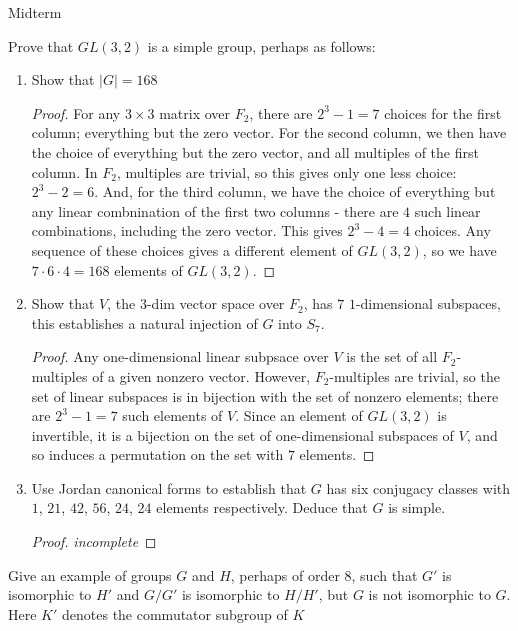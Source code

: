 \documentclass[12pt]{article}
\theoremstyle{definition}
\newenvironment{problem}[2][Problem]{\begin{trivlist}
\item[\hskip \labelsep {\bfseries #1}\hskip \labelsep {\bfseries #2.}]}{\end{trivlist}}
\begin{document}
\begin{section}{Midterm}
\begin{problem}{6}
\end{problem}
\begin{problem}{7}
	Prove that $GL(3,2)$ is a simple group, perhaps as follows:
	\begin{enumerate}[label=(\alph*)]
		\item Show that $\left \lvert { G } \right \lvert  = 168$
			\begin{proof}
				For any $3 \times 3$ matrix over $F_2$, there are $2^3 - 1 = 7$ choices for the first column; everything but the zero vector. For the second column, we then have the choice of everything but the zero vector, and all multiples of the first column. In $F_2$, multiples are trivial, so this gives only one less choice: $2^3 - 2 = 6$. And, for the third column, we have the choice of everything but any linear combnination of the first two columns - there are $4$ such linear combinations, including the zero vector. This gives $2^3 - 4 = 4$ choices. Any sequence of these choices gives a different element of $GL(3,2)$, so we have $7 \cdot 6 \cdot 4 = 168$ elements of $GL(3,2)$.
			\end{proof}
		\item Show that $V$, the $3$-dim vector space over $F_2$, has $7$ $1$-dimensional subspaces, this establishes a natural injection of $G$ into $S_7$.
			\begin{proof}
				Any one-dimensional linear subpsace over $V$ is the set of all $F_2$-multiples of a given nonzero vector. However, $F_2$-multiples are trivial, so the set of linear subspaces is in bijection with the set of nonzero elements; there are $2^3 - 1 = 7$ such elements of $V$. Since an element of $GL(3,2)$ is invertible, it is a bijection on the set of one-dimensional subspaces of $V$, and so induces a permutation on the set with $7$ elements.
			\end{proof}
		\item Use Jordan canonical forms to establish that $G$ has six conjugacy classes with $1$, $21$, $42$, $56$, $24$, $24$ elements respectively. Deduce that $G$ is simple.
			\begin{proof}
				\textit{incomplete}
			\end{proof}
	\end{enumerate}
\end{problem}
\begin{problem}{8}
	Give an example of groups $G$ and $H$, perhaps of order $8$, such that $G'$ is isomorphic to $H'$ and $G/G'$ is isomorphic to $H/H'$, but $G$ is not isomorphic to $G$. Here $K'$ denotes the commutator subgroup of $K$

\end{problem}
\end{section}
\end{document}
